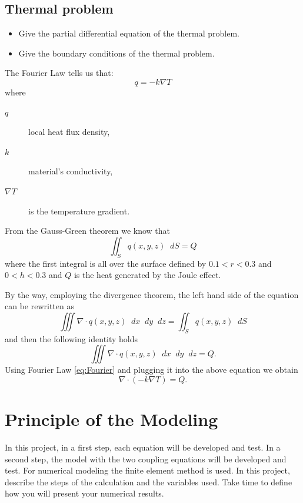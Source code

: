 \documentclass{article}
\newcommand{\diff}{\mathop{}\!d}
\begin{document}
\subsection{Thermal problem}
\begin{itemize}
	\item Give the partial differential equation of the thermal problem.
	\item Give the boundary conditions of the thermal problem.
\end{itemize}
\begin{mdframed}
	The Fourier Law tells us that:
	\begin{equation}
	\label{eq:Fourier}
	q=-k\nabla T
	\end{equation}
	where
	\begin{description}
		\item[$ q$] local heat flux density,
		\item[$ k $] material's conductivity,
		\item[$ \nabla T $] is the temperature gradient. 
	\end{description}
	From the Gauss-Green theorem we know that 
	\[
	\iint_S q(x,y,z) \diff S=Q
	\]
	where the first integral is all over the surface defined by $ 0.1<r<0.3 $ and $ 0<h<0.3 $ and $ Q $ is the heat generated by the Joule effect.
	
	By the way, employing the divergence theorem, the left hand side of the equation can be rewritten as  
	\[ \iiint \nabla\cdot q(x,y,z) \diff x\diff y\diff z = \iint_S q(x,y,z) \diff S  \]
	and then the following identity holds
	\begin{equation}
	\iiint \nabla\cdot q(x,y,z) \diff x\diff y\diff z = Q.
	\end{equation}
	Using Fourier Law \eqref{eq:Fourier} and plugging it into the above equation we obtain
	\begin{equation}
	\nabla\cdot(-k\nabla T)=Q.
	\end{equation}
\end{mdframed}

	
\section{Principle of the Modeling}
In this project, in a first step, each equation will be developed and test. In a second step, the model with the
two coupling equations will be developed and test. For numerical modeling the finite element method is
used. In this project, describe the steps of the calculation and the variables used. Take time to define how you
will present your numerical results.
\end{document}
